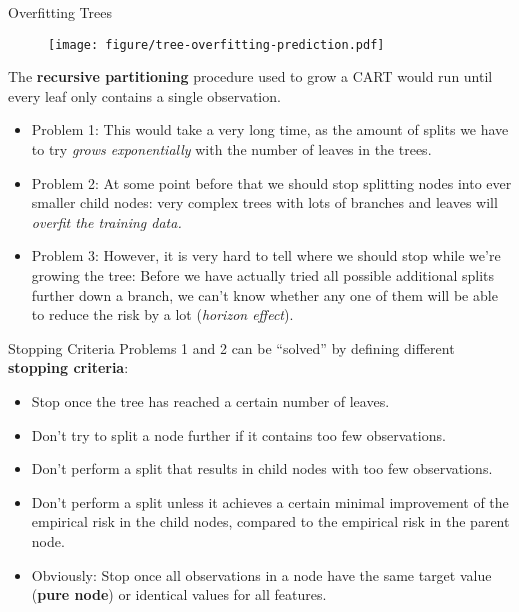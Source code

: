 \documentclass[11pt,compress,t,notes=noshow, xcolor=table]{beamer}
\begin{document}
\begin{vbframe}{Overfitting Trees}
\begin{itemize}
\begin{figure}
\centering
\texttt{[image: figure/tree-overfitting-prediction.pdf]}
\end{figure}

\end{itemize}

\framebreak

The \textbf{recursive partitioning} procedure used to grow a CART would run until every leaf only contains a single observation. 
\begin{itemize}
\item Problem 1: This would take a very long time, as the amount of splits we have to try \emph{grows exponentially} with the number of leaves in the trees.
\item Problem 2: At some point before that we should stop splitting nodes into ever smaller child nodes: very complex trees with lots of branches and leaves will \emph{overfit the training data.}
\item Problem 3: However, it is very hard to tell where we should stop while we're growing the tree: Before we have actually tried all possible additional splits further down a branch, we can't know whether any one of them will be able to reduce the risk by a lot (\emph{horizon effect}).
\end{itemize}
\end{vbframe}

\begin{vbframe}{Stopping Criteria}
Problems 1 and 2 can be \enquote{solved} by defining different \textbf{stopping criteria}:
  \begin{itemize}
    \item Stop once the tree has reached a certain number of leaves.
    \item Don't try to split a node further if it contains too few observations.
    \item Don't perform a split that results in child nodes with too few observations.
    \item Don't perform a split unless it achieves a certain minimal improvement of the empirical risk in the child nodes, compared to the empirical risk in the parent node.
    \item Obviously: Stop once all observations in a node have the same target value (\textbf{pure node}) or identical values for all features. 
  \end{itemize}
\end{vbframe}
\end{document}
